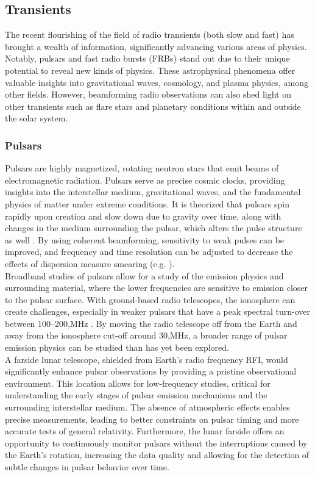 \subsection{Transients}
The recent flourishing of the field of radio transients (both slow and fast) has brought a wealth of information, significantly advancing various areas of physics. Notably, pulsars and fast radio bursts (FRBs) stand out due to their unique potential to reveal new kinds of physics. These astrophysical phenomena offer valuable insights into gravitational waves, cosmology, and plasma physics, among other fields. However, beamforming radio observations can also shed light on other transients such as flare stars and planetary conditions within and outside the solar system. 

\subsubsection{Pulsars}
Pulsars are highly magnetized, rotating neutron stars that emit beams of electromagnetic radiation. Pulsars serve as precise cosmic clocks, providing insights into the interstellar medium, gravitational waves, and the fundamental physics of matter under extreme conditions. It is theorized that pulsars spin rapidly upon creation and slow down due to gravity over time, along with changes in the medium surrounding the pulsar, which alters the pulse structure as well \citep{LW_2013}. By using coherent beamforming, sensitivity to weak pulses can be improved, and frequency and time resolution can be adjusted to decrease the effects of dispersion measure smearing (e.g. \cite{WL_2020}).\\

Broadband studies of pulsars allow for a study of the emission physics and surrounding material, where the lower frequencies are sensitive to emission closer to the pulsar surface. With ground-based radio telescopes, the ionosphere can create challenges, especially in weaker pulsars that have a peak spectral turn-over between 100--200,MHz \citep{Stappers_2011}. By moving the radio telescope off from the Earth and away from the ionosphere cut-off around 30,MHz, a broader range of pulsar emission physics can be studied than has yet been explored.\\

A farside lunar telescope, shielded from Earth’s radio frequency RFI, would significantly enhance pulsar observations by providing a pristine observational environment. This location allows for low-frequency studies, critical for understanding the early stages of pulsar emission mechanisms and the surrounding interstellar medium. The absence of atmospheric effects enables precise measurements, leading to better constraints on pulsar timing and more accurate tests of general relativity. Furthermore, the lunar farside offers an opportunity to continuously monitor pulsars without the interruptions caused by the Earth’s rotation, increasing the data quality and allowing for the detection of subtle changes in pulsar behavior over time.


